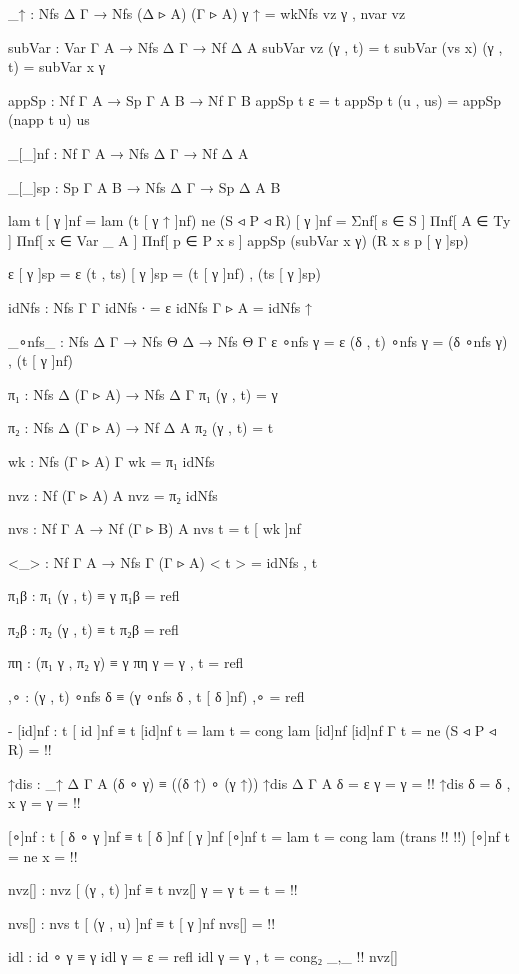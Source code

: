 \begin{code}
_↑ : Nfs Δ Γ → Nfs (Δ ▹ A) (Γ ▹ A)
γ ↑ = wkNfs vz γ , nvar vz

subVar : Var Γ A → Nfs Δ Γ → Nf Δ A
subVar vz (γ , t) = t
subVar (vs x) (γ , t) = subVar x γ

appSp : Nf Γ A → Sp Γ A B → Nf Γ B
appSp t ε = t
appSp t (u , us) = appSp (napp t u) us

_[_]nf : Nf Γ A → Nfs Δ Γ → Nf Δ A

_[_]sp : Sp Γ A B → Nfs Δ Γ → Sp Δ A B

lam t [ γ ]nf = lam (t [ γ ↑ ]nf)
ne (S ◃ P ◃ R) [ γ ]nf = Σnf[ s ∈ S ]
  Πnf[ A ∈ Ty ] Πnf[ x ∈ Var _ A ] Πnf[ p ∈ P x s ]
  appSp (subVar x γ) (R x s p [ γ ]sp)

ε [ γ ]sp = ε
(t , ts) [ γ ]sp = (t [ γ ]nf) , (ts [ γ ]sp)

idNfs : Nfs Γ Γ
idNfs {∙} = ε
idNfs {Γ ▹ A} = idNfs ↑

_∘nfs_ : Nfs Δ Γ → Nfs Θ Δ → Nfs Θ Γ
ε ∘nfs γ = ε
(δ , t) ∘nfs γ = (δ ∘nfs γ) , (t [ γ ]nf)

π₁ : Nfs Δ (Γ ▹ A) → Nfs Δ Γ
π₁ (γ , t) = γ

π₂ : Nfs Δ (Γ ▹ A) → Nf Δ A
π₂ (γ , t) = t

wk : Nfs (Γ ▹ A) Γ
wk = π₁ idNfs

nvz : Nf (Γ ▹ A) A
nvz = π₂ idNfs

nvs : Nf Γ A → Nf (Γ ▹ B) A
nvs t = t [ wk ]nf

<_> : Nf Γ A → Nfs Γ (Γ ▹ A)
< t > = idNfs , t

π₁β : π₁ (γ , t) ≡ γ
π₁β = refl

π₂β : π₂ (γ , t) ≡ t
π₂β = refl

πη : (π₁ γ , π₂ γ) ≡ γ
πη {γ = γ , t} = refl

,∘ : (γ , t) ∘nfs δ ≡ (γ ∘nfs δ , t [ δ ]nf)
,∘ = refl

{-
[id]nf : t [ id ]nf ≡ t
[id]nf {t = lam t} = cong lam [id]nf
[id]nf {Γ} {t = ne (S ◃ P ◃ R)} = {!!}

↑dis : _↑ {Δ} {Γ} {A} (δ ∘ γ) ≡ ((δ ↑) ∘ (γ ↑))
↑dis {Δ} {Γ} {A} {δ = ε} {γ = γ} = {!!}
↑dis {δ = δ , x} {γ = γ} = {!!}

[∘]nf : t [ δ ∘ γ ]nf ≡ t [ δ ]nf [ γ ]nf
[∘]nf {t = lam t} = cong lam (trans {!!} {!!})
[∘]nf {t = ne x} = {!!}

nvz[] : nvz [ (γ , t) ]nf ≡ t
nvz[] {γ = γ} {t = t} = {!!}

nvs[] : nvs t [ (γ , u) ]nf ≡ t [ γ ]nf
nvs[] = {!!}

idl : id ∘ γ ≡ γ
idl {γ = ε} = refl
idl {γ = γ , t} = cong₂ _,_ {!!} nvz[]

}
\end{code}
